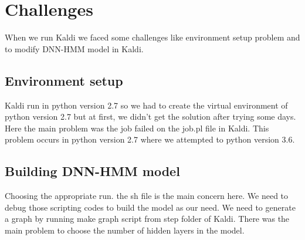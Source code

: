 \documentclass{standalone}
\begin{document}
\chapter{Challenges}

When we run Kaldi we faced some challenges like environment setup problem and to modify DNN-HMM model in Kaldi.

    \section{Environment setup}
Kaldi run in python version 2.7 so we had to create the virtual environment of python version 2.7 but at first, we didn't get the solution after trying some days. Here the main problem was the job failed on the job.pl file in Kaldi. This problem occurs in python version 2.7 where we attempted to python version 3.6.

    \section{Building DNN-HMM model}
 Choosing the appropriate run. the sh file is the main concern here. We need to debug those scripting codes to build the model as our need.  We need to generate a graph by running make graph script from step folder of Kaldi. There was the main problem to choose the number of hidden layers in the model.\\
    
\end{document}
